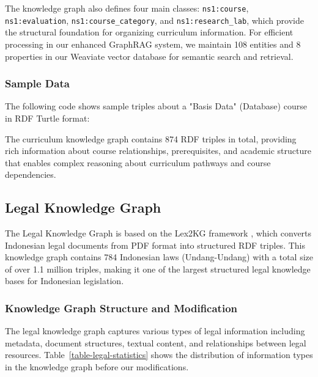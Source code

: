 The knowledge graph also defines four main classes: \texttt{ns1:course}, \texttt{ns1:evaluation}, \texttt{ns1:course\_category}, and \texttt{ns1:research\_lab}, which provide the structural foundation for organizing curriculum information. For efficient processing in our enhanced GraphRAG system, we maintain 108 entities and 8 properties in our Weaviate vector database for semantic search and retrieval.

\subsubsection{Sample Data}
The following code shows sample triples about a "Basis Data" (Database) course in RDF Turtle format:



The curriculum knowledge graph contains 874 RDF triples in total, providing rich information about course relationships, prerequisites, and academic structure that enables complex reasoning about curriculum pathways and course dependencies.

\vspace{0.5cm}
\subsection{Legal Knowledge Graph}
\label{legal-kg}
\hrulefill

The Legal Knowledge Graph is based on the Lex2KG framework \citep{abdurahman2021lex2kg}, which converts Indonesian legal documents from PDF format into structured RDF triples. This knowledge graph contains 784 Indonesian laws (Undang-Undang) with a total size of over 1.1 million triples, making it one of the largest structured legal knowledge bases for Indonesian legislation.

\subsubsection{Knowledge Graph Structure and Modification}
The legal knowledge graph captures various types of legal information including metadata, document structures, textual content, and relationships between legal resources. Table~\ref{table-legal-statistics} shows the distribution of information types in the knowledge graph before our modifications.

